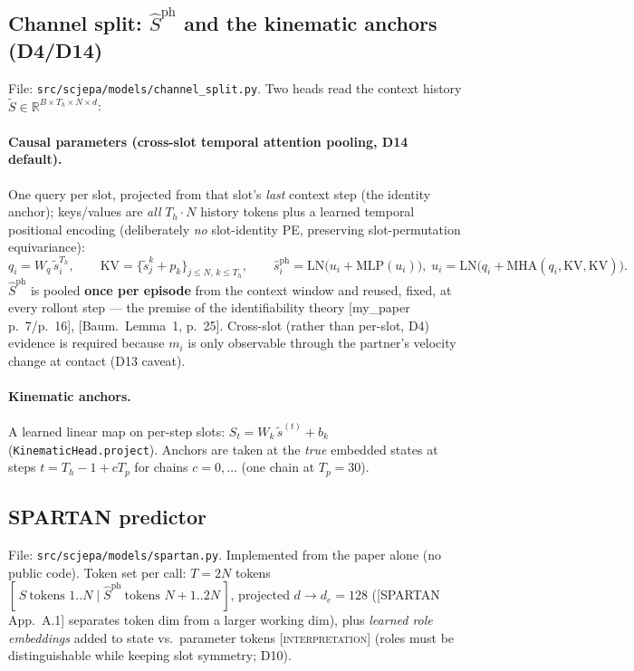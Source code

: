 \documentclass[11pt]{article}
\newcommand{\code}[1]{\texttt{\small #1}}
\newcommand{\paper}[1]{\textcolor{blue!60!black}{[#1]}}
\newcommand{\interp}{\textcolor{orange!80!black}{[\textsc{interpretation}]}}
\newcommand{\Sph}{\hat{S}^{\mathrm{ph}}}
\begin{document}
\subsection{Channel split: $\Sph$ and the kinematic anchors (D4/D14)}
File: \code{src/scjepa/models/channel\_split.py}. Two heads read the context history
$\tilde S \in \mathbb R^{B\times T_h\times N\times d}$:

\paragraph{Causal parameters (cross-slot temporal attention pooling, D14 default).}
One query per slot, projected from that slot's \emph{last} context step (the identity
anchor); keys/values are \emph{all} $T_h\!\cdot\!N$ history tokens plus a learned temporal
positional encoding (deliberately \emph{no} slot-identity PE, preserving slot-permutation
equivariance):
\[
  q_i = W_q\,\tilde s_i^{T_h},\qquad
  \mathrm{KV} = \{\tilde s_j^{k} + p_k\}_{j\le N,\,k\le T_h},\qquad
  \hat s^{\mathrm{ph}}_i = \mathrm{LN}\!\big(u_i + \mathrm{MLP}(u_i)\big),\;
  u_i = \mathrm{LN}\!\big(q_i + \mathrm{MHA}(q_i,\mathrm{KV},\mathrm{KV})\big).
\]
$\Sph$ is pooled \textbf{once per episode} from the context window and reused, fixed, at
every rollout step --- the premise of the identifiability theory
\paper{my\_paper p.~7/p.~16}, \paper{Baum.\ Lemma~1, p.~25}. Cross-slot (rather than
per-slot, D4) evidence is required because $m_i$ is only observable through the partner's
velocity change at contact (D13 caveat).

\paragraph{Kinematic anchors.} A learned linear map on per-step slots:
$S_t = W_k\,\tilde s^{(t)} + b_k$ (\code{KinematicHead.project}). Anchors are taken at the
\emph{true} embedded states at steps $t = T_h\!-\!1 + cT_p$ for chains $c = 0,\dots$
(one chain at $T_p{=}30$).

\subsection{SPARTAN predictor}
File: \code{src/scjepa/models/spartan.py}. Implemented from the paper alone (no public
code). Token set per call: $T = 2N$ tokens
$[\,S\ \text{tokens } 1..N \mid \Sph\ \text{tokens } N{+}1..2N\,]$, projected
$d \to d_e = 128$ (\paper{SPARTAN App.~A.1} separates token dim from a larger working
dim), plus \emph{learned role embeddings} added to state vs.\ parameter tokens
\interp{} (roles must be distinguishable while keeping slot symmetry; D10).
\end{document}
